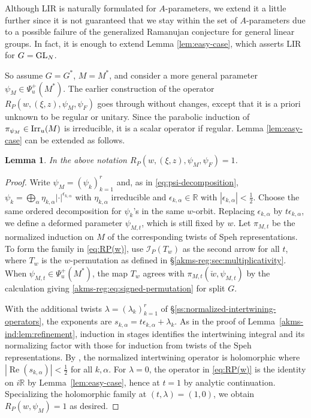 \documentclass[11pt,reqno]{amsart}
\theoremstyle{plain}
\newtheorem{lem}[thm]{Lemma}
\theoremstyle{definition}
\newcommand{\R}{\mathbb{R}}
\newcommand{\cI}{\mathcal{I}}
\newcommand{\GL}{\tu{GL}}
\newcommand{\Irr}{\tu{Irr}}
\newcommand{\tu}{\textup}
\numberwithin{equation}{subsection}
\begin{document}
Although LIR is naturally formulated for $A$-parameters, we extend it a little further since it is not guaranteed that we stay within the set of $A$-parameters due to a possible failure of the generalized Ramanujan conjecture for general linear groups. 
In fact, it is enough to extend Lemma \ref{lem:easy-case}, which asserts LIR for $G=\GL_N$.

So assume $G=G^*$, $M=M^*$, and consider a more general parameter $\psi_M\in \Psi^+_u(M^*)$. The earlier construction of the operator $R_P(w, (\xi,z), \psi_{M}, \psi_F)$ goes through without changes, except that it is a priori unknown to be regular or unitary. Since the parabolic induction of $\pi_{\psi_M}\in \Irr_u(M)$ is irreducible, it is a scalar operator if regular.
Lemma \ref{lem:easy-case} can be extended as follows.

\begin{lem}\label{lem:LIR-GL-beyond-A-parameters}
In the above notation $R_P(w, (\xi,z), \psi_{M}, \psi_F)=1$.
\end{lem}

\begin{proof}
Write $\psi_M=(\psi_k)_{k=1}^r$ and, as in \eqref{eq:psi-decomposition},
$\psi_k=\bigoplus_\alpha\eta_{k,\alpha}|\cdot|^{\epsilon_{k,\alpha}}$
with $\eta_{k,\alpha}$ irreducible and $\epsilon_{k,\alpha}\in \R$ with $|\epsilon_{k,\alpha}|<\tfrac12$.
Choose the same ordered decomposition for $\psi_k$'s in the same $w$-orbit. Replacing
$\epsilon_{k,\alpha}$ by $t\epsilon_{k,\alpha}$, we define a deformed parameter $\psi_{M,t}$, which is still fixed
by $w$. Let $\pi_{M,t}$ be the normalized induction on $M$ of the
corresponding twists of Speh representations. To form the family in \eqref{eq:RP(w)},
use $\cI_P(T_w)$ as the second arrow for all $t$, where $T_w$ is the $w$-permutation as defined in \S\ref{akms-reg:sec:multiplicativity}. When $\psi_{M,t}\in\Psi_u^+(M^*)$, the map $T_w$ agrees with $\pi_{M,t}(\breve w,\psi_{M,t})$ by the calculation giving  \eqref{akms-reg:eq:signed-permutation} for split $G$.

With the additional twists $\lambda=(\lambda_k)_{k=1}^r$ of
\S\ref{ss:normalized-intertwining-operators}, the exponents are
$s_{k,\alpha}=t\epsilon_{k,\alpha}+\lambda_k$. As in the proof of Lemma~\ref{akms-ind:lem:refinement}, induction in stages identifies the intertwining integral and its normalizing factor with those for induction from twists of the Speh representations.
By \cite[Prop.~I.10]{MW89}, the normalized intertwining operator is holomorphic where $|\operatorname{Re}(s_{k,\alpha})|<\tfrac12$ for all $k,\alpha$.
For $\lambda=0$, the operator in \eqref{eq:RP(w)} is the identity on $i\R$ by Lemma~\ref{lem:easy-case}, hence at $t=1$ by analytic continuation. Specializing the holomorphic family at $(t,\lambda)=(1,0)$, we obtain  $R_P(w,\psi_M)=1$ as desired.
\end{proof}
\end{document}
